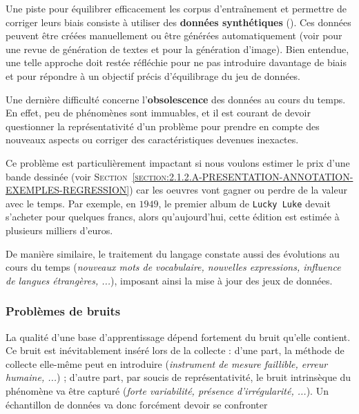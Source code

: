 			\begin{leftBarIdea}
				Une piste pour équilibrer efficacement les corpus d'entraînement et permettre de corriger leurs biais consiste à utiliser des \textbf{données synthétiques} (\cite{jaipuria-etal:2020:deflating-dataset-bias}).
				Ces données peuvent être créées manuellement ou être générées automatiquement (voir \cite{shorten-etal:2021:text-data-augmentation} pour une revue de génération de textes et \cite{shorten-khoshgoftaar:2019:survey-image-data} pour la génération d'image).
				Bien entendue, une telle approche doit restée réfléchie pour ne pas introduire davantage de biais et pour répondre à un objectif précis d'équilibrage du jeu de données.
			\end{leftBarIdea}
			
			Une dernière difficulté concerne l'\textbf{obsolescence} des données au cours du temps.
			En effet, peu de phénomènes sont immuables, et il est courant de devoir questionner la représentativité d'un problème pour prendre en compte des nouveaux aspects ou corriger des caractéristiques devenues inexactes.
			\begin{leftBarExamples}
				Ce problème est particulièrement impactant si nous voulons estimer le prix d'une bande dessinée (voir \textsc{Section~\ref{section:2.1.2.A-PRESENTATION-ANNOTATION-EXEMPLES-REGRESSION}}) car les oeuvres vont gagner ou perdre de la valeur avec le temps.
				Par exemple, en $1949$, le premier album de \texttt{Lucky Luke} devait s'acheter pour quelques francs, alors qu'aujourd'hui, cette édition est estimée à plusieurs milliers d'euros.
				
				De manière similaire, le traitement du langage constate aussi des évolutions au cours du temps (\textit{nouveaux mots de vocabulaire, nouvelles expressions, influence de langues étrangères, ...}), imposant ainsi la mise à jour des jeux de données.
			\end{leftBarExamples}
		
		
		\subsubsection{Problèmes de bruits}
		\label{section:2.3.1.B-DEFIS-ANNOTATION-ASPECT-DONNEES-BRUITS}
		
			La qualité d'une base d'apprentissage dépend fortement du bruit qu'elle contient.
			Ce bruit est inévitablement inséré lors de la collecte :
			d'une part, la méthode de collecte elle-même peut en introduire (\textit{instrument de mesure faillible, erreur humaine, ...}) ;
			d'autre part, par soucis de représentativité, le bruit intrinsèque du phénomène va être capturé (\textit{forte variabilité, présence d'irrégularité, ...}).
			Un échantillon de données va donc forcément devoir se confronter 

